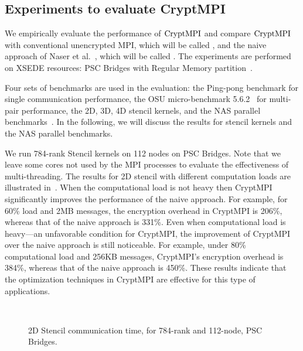 \subsection{Experiments to evaluate CryptMPI}
\label{sec:eval}

We empirically evaluate the performance of $\textrm{CryptMPI}$ and compare $\textrm{CryptMPI}$ with
conventional unencrypted MPI, which will be called \Unencrypted,
and the naive approach of
Naser et al.~\cite{Cluster:Naser19}, which will be called {\Naive}.
The experiments are performed on XSEDE resources: PSC
Bridges with Regular Memory partition~\cite{XSEDE}.

Four sets of benchmarks are used in the evaluation: the Ping-pong benchmark for single
communication performance, the OSU micro-benchmark 5.6.2~\cite{OSUBM} for multi-pair
performance, the 2D, 3D, 4D stencil kernels, and the NAS parallel
benchmarks~\cite{Bailey:1991:NPB:2748645.2748648}.
In the following, we will discuss the results for stencil kernels and the NAS parallel
benchmarks. 

We run 784-rank Stencil kernels on 112 nodes on PSC Bridges. Note that we leave
some cores not used by the MPI processes to evaluate the effectiveness of multi-threading. 
The results for 2D stencil with different computation loads
are illustrated in~.
When the computational load is not heavy then CryptMPI
significantly improves the performance of the naive  approach.
For example, for 60\% load and 2MB messages,
the encryption overhead in CryptMPI is 206\%,
whereas that of the naive approach is 331\%.
Even when computational load is heavy---an unfavorable condition for CryptMPI,
the improvement of CryptMPI over the naive approach is still noticeable.
For example, under 80\% computational load and 256KB messages,
CryptMPI's encryption overhead is 384\%,
whereas that of the naive approach is 450\%. {
These results indicate that the optimization techniques in CryptMPI
are effective for this type of applications.}

\begin{figure}[!tbp]
\centering
{}
\,
\captionsetup{singlelinecheck=false}
\caption{2D Stencil communication time, for 784-rank and 112-node, PSC Bridges.}
\label{fig:2d_stencil}
\end{figure}

